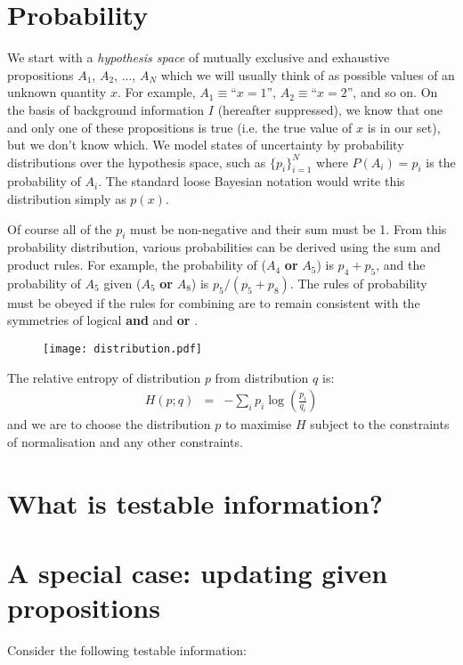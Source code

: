 \documentclass[a4paper, 11pt]{article}
\begin{document}
\section{Probability}
We start with a {\it hypothesis space} of mutually exclusive and
exhaustive propositions $A_1$, $A_2$, ..., $A_N$ which we will usually
think of as possible values of an unknown quantity $x$. For example,
$A_1 \equiv $``$x=1$'', $A_2 \equiv $``$x=2$'', and so on.
On the basis of background
information $I$ (hereafter suppressed), we know that one and only one of these
propositions is true (i.e. the true value of $x$ is in our set),
but we don't know which. We model states of
uncertainty by probability distributions over the hypothesis space,
such as $\{p_i\}_{i=1}^N$ where $P(A_i) = p_i$ is the probability of $A_i$.
The standard loose Bayesian notation would write this distribution simply
as $p(x)$.

Of course all of the $p_i$ must be non-negative and their sum must be 1.
From this probability distribution, various probabilities can be derived
using the sum and product rules. For example, the probability of
($A_4$ {\bf or} $A_5$) is $p_4 + p_5$, and the probability of $A_5$ given
($A_5$ {\bf or} $A_8$) is $p_5/(p_5 + p_8)$. The rules of probability must
be obeyed if the rules for combining are to remain consistent
with the symmetries of logical {\bf and} and {\bf or}
\citep{2010arXiv1008.4831K}.

\begin{figure}
\begin{center}
\texttt{[image: distribution.pdf]}
\caption{\label{fig:distribution}}
\end{center}
\end{figure}

The relative entropy of distribution $p$ from distribution $q$ is:
\begin{eqnarray}
H(p; q) &=& -\sum_i p_i \log\left(\frac{p_i}{q_i}\right) 
\end{eqnarray}
and we are to choose the distribution $p$ to maximise $H$ subject to the
constraints of normalisation and any other constraints.

\section{What is testable information?}


\section{A special case: updating given propositions}
Consider the following testable information:
\end{document}
